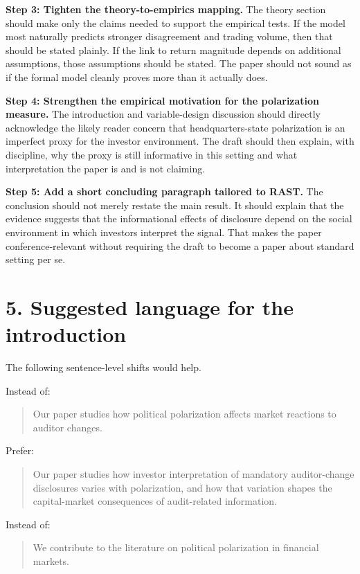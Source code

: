 \documentclass[11pt]{article}
\begin{document}
\textbf{Step 3: Tighten the theory-to-empirics mapping.} The theory section should make only the claims needed to support the empirical tests. If the model most naturally predicts stronger disagreement and trading volume, then that should be stated plainly. If the link to return magnitude depends on additional assumptions, those assumptions should be stated. The paper should not sound as if the formal model cleanly proves more than it actually does.

\textbf{Step 4: Strengthen the empirical motivation for the polarization measure.} The introduction and variable-design discussion should directly acknowledge the likely reader concern that headquarters-state polarization is an imperfect proxy for the investor environment. The draft should then explain, with discipline, why the proxy is still informative in this setting and what interpretation the paper is and is not claiming.

\textbf{Step 5: Add a short concluding paragraph tailored to RAST.} The conclusion should not merely restate the main result. It should explain that the evidence suggests that the informational effects of disclosure depend on the social environment in which investors interpret the signal. That makes the paper conference-relevant without requiring the draft to become a paper about standard setting per se.

\section*{5. Suggested language for the introduction}

The following sentence-level shifts would help.

Instead of:
\begin{quote}
Our paper studies how political polarization affects market reactions to auditor changes.
\end{quote}

Prefer:
\begin{quote}
Our paper studies how investor interpretation of mandatory auditor-change disclosures varies with polarization, and how that variation shapes the capital-market consequences of audit-related information.
\end{quote}

Instead of:
\begin{quote}
We contribute to the literature on political polarization in financial markets.
\end{quote}
\end{document}
